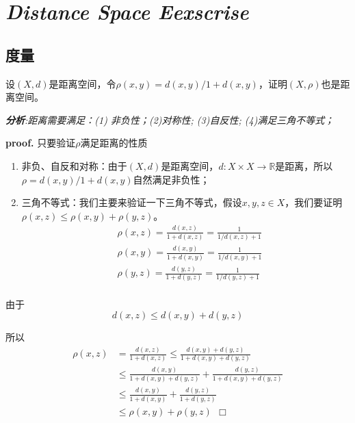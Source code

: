 \chapter{\textsl{Distance Space Eexscrise}}

\section{度量}

\begin{mdframed}
    \begin{question}
        设$(X,d)$是距离空间，令$\rho(x,y)=d(x,y)/1+d(x,y)$，证明$(X,\rho)$也是距离空间。
    \end{question}
\end{mdframed}

    \textsl{\textbf{分析}:距离需要满足：(1) 非负性；(2)对称性; (3)自反性; (4)满足三角不等式；}

    \textbf{proof.} 只要验证$\rho$满足距离的性质
    \begin{enumerate}[itemindent=2em]
        \item 非负、自反和对称：由于$(X,d)$是距离空间，$d:X\times X\rightarrow \mathbb{R}$是距离，所以$\rho = d(x,y)/1+d(x,y)$自然满足非负性；
        \item 三角不等式：我们主要来验证一下三角不等式，假设$x,y,z\in X$，我们要证明$\rho(x,z)\leqslant \rho(x,y)+\rho(y,z)$。
        \begin{equation}
            \begin{aligned}
                &\rho(x,z)=\frac{d(x,z)}{1+d(x,z)}=\frac{1}{1/d(x,z)+1}\\
                &\rho(x,y)=\frac{d(x,y)}{1+d(x,y)}=\frac{1}{1/d(x,y)+1}\\
                &\rho(y,z)=\frac{d(y,z)}{1+d(y,z)}=\frac{1}{1/d(y,z)+1}\\
            \end{aligned}
        \end{equation}
    \end{enumerate}

    由于
    \begin{equation}
        d(x,z)\leqslant d(x,y)+d(y,z)
    \end{equation}

    所以
    \begin{equation}
        \begin{aligned}
            \rho(x,z)&=\frac{d(x,z)}{1+d(x,z)}\leqslant \frac{d(x,y)+d(y,z)}{1+d(x,y)+d(y,z)}\\
            &\leqslant \frac{d(x,y)}{1+d(x,y)+d(y,z)}+\frac{d(y,z)}{1+d(x,y)+d(y,z)}\\
            &\leqslant \frac{d(x,y)}{1+d(x,y)}+\frac{d(y,z)}{1+d(y,z)}\\
            &\leqslant \rho(x,y)+\rho(y,z) \ \ \Box
        \end{aligned}
    \end{equation}


